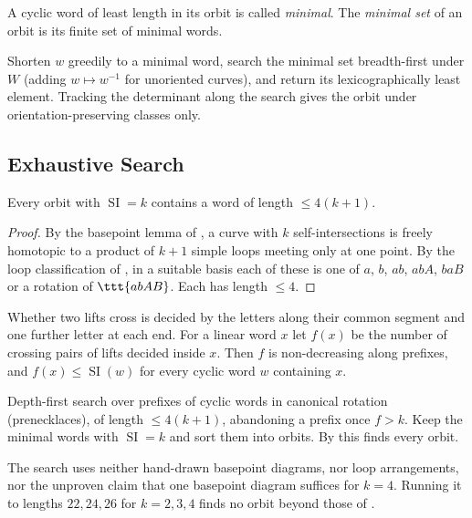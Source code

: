 \documentclass[10pt]{article}
\begin{document}
A cyclic word of least length in its orbit is called \emph{minimal}.
The \emph{minimal set} of an orbit is its finite set of minimal words.

\begin{algo}
	Shorten $w$ greedily to a minimal word, search the minimal set breadth-first under $W$ (adding $w \mapsto w^{-1}$ for unoriented curves), and return its lexicographically least element.
	Tracking the determinant along the search gives the orbit under orientation-preserving classes only.
\end{algo}

\subsection{Exhaustive Search}

\begin{prop}\label{prop:length}
	Every orbit with $\operatorname{SI} = k$ contains a word of length $\leq 4(k+1)$.
\end{prop}

\begin{proof}
	By the basepoint lemma of \citet{crisp98}, a curve with $k$ self-intersections is freely homotopic to a product of $k+1$ simple loops meeting only at one point.
	By the loop classification of \citet{bck95}, in a suitable basis each of these is one of $a$, $b$, $ab$, $abA$, $baB$ or a rotation of $\ttt{abAB}$.
	Each has length $\leq 4$.
\end{proof}

\begin{lem}
	Whether two lifts cross is decided by the letters along their common segment and one further letter at each end.
	For a linear word $x$ let $f(x)$ be the number of crossing pairs of lifts decided inside $x$.
	Then $f$ is non-decreasing along prefixes, and $f(x) \leq \operatorname{SI}(w)$ for every cyclic word $w$ containing $x$.
\end{lem}

\begin{algo}
	Depth-first search over prefixes of cyclic words in canonical rotation (prenecklaces), of length $\leq 4(k+1)$, abandoning a prefix once $f > k$.
	Keep the minimal words with $\operatorname{SI} = k$ and sort them into orbits.
	By  this finds every orbit.
\end{algo}

\begin{rmk}
	The search uses neither hand-drawn basepoint diagrams, nor loop arrangements, nor the unproven claim that one basepoint diagram suffices for $k = 4$.
	Running it to lengths $22, 24, 26$ for $k = 2, 3, 4$ finds no orbit beyond those of .
\end{rmk}
\end{document}
